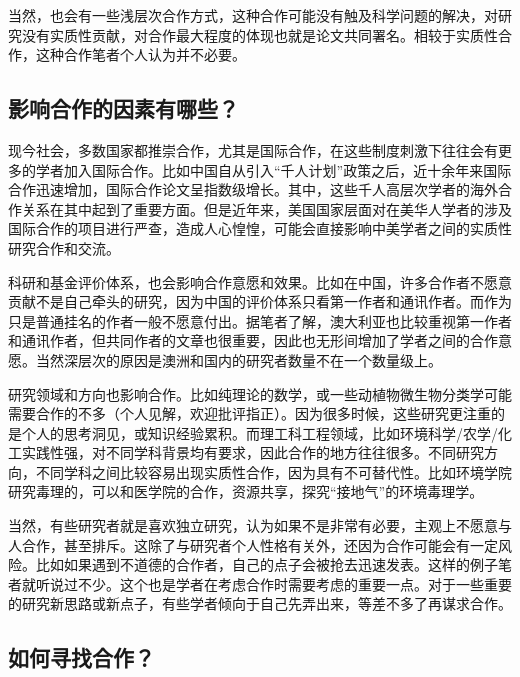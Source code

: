 \documentclass[]{book}
\begin{document}
当然，也会有一些浅层次合作方式，这种合作可能没有触及科学问题的解决，对研究没有实质性贡献，对合作最大程度的体现也就是论文共同署名。相较于实质性合作，这种合作笔者个人认为并不必要。

\hypertarget{ux5f71ux54cdux5408ux4f5cux7684ux56e0ux7d20ux6709ux54eaux4e9b}{%
\subsection{影响合作的因素有哪些？}\label{ux5f71ux54cdux5408ux4f5cux7684ux56e0ux7d20ux6709ux54eaux4e9b}}

现今社会，多数国家都推崇合作，尤其是国际合作，在这些制度刺激下往往会有更多的学者加入国际合作。比如中国自从引入``千人计划''政策之后，近十余年来国际合作迅速增加，国际合作论文呈指数级增长。其中，这些千人高层次学者的海外合作关系在其中起到了重要方面。但是近年来，美国国家层面对在美华人学者的涉及国际合作的项目进行严查，造成人心惶惶，可能会直接影响中美学者之间的实质性研究合作和交流。

科研和基金评价体系，也会影响合作意愿和效果。比如在中国，许多合作者不愿意贡献不是自己牵头的研究，因为中国的评价体系只看第一作者和通讯作者。而作为只是普通挂名的作者一般不愿意付出。据笔者了解，澳大利亚也比较重视第一作者和通讯作者，但共同作者的文章也很重要，因此也无形间增加了学者之间的合作意愿。当然深层次的原因是澳洲和国内的研究者数量不在一个数量级上。

研究领域和方向也影响合作。比如纯理论的数学，或一些动植物微生物分类学可能需要合作的不多（个人见解，欢迎批评指正）。因为很多时候，这些研究更注重的是个人的思考洞见，或知识经验累积。而理工科工程领域，比如环境科学/农学/化工实践性强，对不同学科背景均有要求，因此合作的地方往往很多。不同研究方向，不同学科之间比较容易出现实质性合作，因为具有不可替代性。比如环境学院研究毒理的，可以和医学院的合作，资源共享，探究``接地气''的环境毒理学。

当然，有些研究者就是喜欢独立研究，认为如果不是非常有必要，主观上不愿意与人合作，甚至排斥。这除了与研究者个人性格有关外，还因为合作可能会有一定风险。比如如果遇到不道德的合作者，自己的点子会被抢去迅速发表。这样的例子笔者就听说过不少。这个也是学者在考虑合作时需要考虑的重要一点。对于一些重要的研究新思路或新点子，有些学者倾向于自己先弄出来，等差不多了再谋求合作。

\hypertarget{ux5982ux4f55ux5bfbux627eux5408ux4f5c}{%
\subsection{如何寻找合作？}\label{ux5982ux4f55ux5bfbux627eux5408ux4f5c}}
\end{document}
